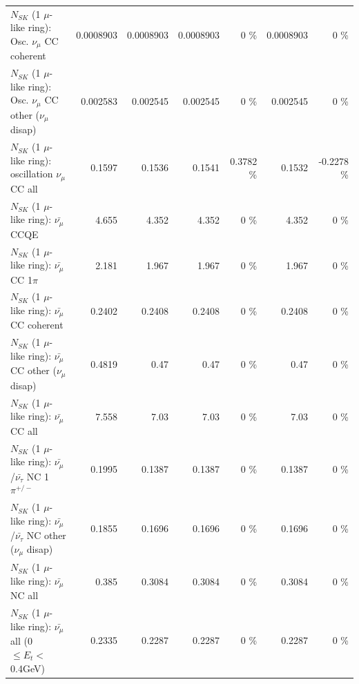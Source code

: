 \begin{table}
\begin{tabular}{| l | r | r | r  r | r  r |}
                        $N_{SK}$ (1 $\mu$-like ring): Osc. $\nu_\mu$ CC coherent &       0.0008903 &       0.0008903 &       0.0008903 &        0 \%  &       0.0008903 &        0 \%  \\ 
         $N_{SK}$ (1 $\mu$-like ring): Osc. $\nu_\mu$ CC other ($\nu_\mu$ disap) &        0.002583 &        0.002545 &        0.002545 &        0 \%  &        0.002545 &        0 \%  \\ 
                      $N_{SK}$ (1 $\mu$-like ring): oscillation $\nu_\mu$ CC all &          0.1597 &          0.1536 &          0.1541 &   0.3782 \%  &          0.1532 &  -0.2278 \%  \\ 
\hline
\hline
                              $N_{SK}$ (1 $\mu$-like ring): $\bar{\nu_\mu}$ CCQE &           4.655 &           4.352 &           4.352 &        0 \%  &           4.352 &        0 \%  \\ 
                         $N_{SK}$ (1 $\mu$-like ring): $\bar{\nu_\mu}$ CC 1$\pi$ &           2.181 &           1.967 &           1.967 &        0 \%  &           1.967 &        0 \%  \\ 
                       $N_{SK}$ (1 $\mu$-like ring): $\bar{\nu_\mu}$ CC coherent &          0.2402 &          0.2408 &          0.2408 &        0 \%  &          0.2408 &        0 \%  \\ 
        $N_{SK}$ (1 $\mu$-like ring): $\bar{\nu_\mu}$ CC other ($\nu_\mu$ disap) &          0.4819 &            0.47 &            0.47 &        0 \%  &            0.47 &        0 \%  \\ 
                          $N_{SK}$ (1 $\mu$-like ring): $\bar{\nu_{\mu}}$ CC all &           7.558 &            7.03 &            7.03 &        0 \%  &            7.03 &        0 \%  \\ 
\hline
  $N_{SK}$ (1 $\mu$-like ring): $\bar{\nu_\mu}$/$\bar{\nu_\tau}$ NC 1$\pi^{+/-}$ &          0.1995 &          0.1387 &          0.1387 &        0 \%  &          0.1387 &        0 \%  \\ 
$N_{SK}$ (1 $\mu$-like ring): $\bar{\nu_\mu}$/$\bar{\nu_\tau}$ NC other ($\nu_\mu$ disap) &          0.1855 &          0.1696 &          0.1696 &        0 \%  &          0.1696 &        0 \%  \\ 
                          $N_{SK}$ (1 $\mu$-like ring): $\bar{\nu_{\mu}}$ NC all &           0.385 &          0.3084 &          0.3084 &        0 \%  &          0.3084 &        0 \%  \\ 
\hline
   $N_{SK}$ (1 $\mu$-like ring): $\bar{\nu_{\mu}}$ all (0 $\leq E_{t} <$ 0.4GeV) &          0.2335 &          0.2287 &          0.2287 &        0 \%  &          0.2287 &        0 \%  \\ 

\end{tabular}
\end{table}
